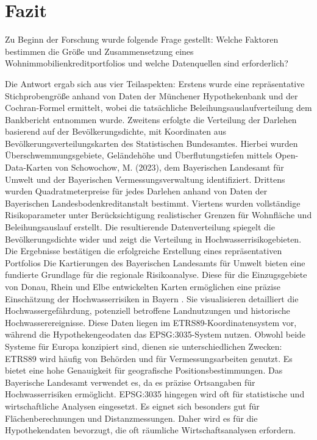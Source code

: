  \section{Fazit}
 Zu Beginn der Forschung wurde folgende Frage gestellt:
 Welche Faktoren bestimmen die Größe und Zusammensetzung eines Wohnimmobilienkreditportfolios und welche Datenquellen sind erforderlich?

 Die Antwort ergab sich aus vier Teilaspekten: Erstens wurde eine repräsentative Stichprobengröße anhand von Daten der Münchener Hypothekenbank und der Cochran-Formel ermittelt, wobei die tatsächliche Beleihungsauslaufverteilung dem Bankbericht entnommen wurde. Zweitens erfolgte die Verteilung der Darlehen basierend auf der Bevölkerungsdichte, mit Koordinaten aus Bevölkerungsverteilungskarten des Statistischen Bundesamtes. Hierbei wurden Überschwemmungsgebiete, Geländehöhe und Überflutungstiefen mittels Open-Data-Karten von Schowochow, M. (2023), dem Bayerischen Landesamt für Umwelt und der Bayerischen Vermessungsverwaltung identifiziert. Drittens wurden Quadratmeterpreise für jedes Darlehen anhand von Daten der Bayerischen Landesbodenkreditanstalt bestimmt. Viertens wurden vollständige Risikoparameter unter Berücksichtigung realistischer Grenzen für Wohnfläche und Beleihungsauslauf erstellt. Die resultierende Datenverteilung spiegelt die Bevölkerungsdichte wider und zeigt die Verteilung in Hochwasserrisikogebieten. Die Ergebnisse bestätigen die erfolgreiche Erstellung eines repräsentativen Portfolios
 Die Kartierungen des Bayerischen Landesamts für Umwelt bieten eine fundierte Grundlage für die regionale Risikoanalyse. Diese für die Einzugsgebiete von Donau, Rhein und Elbe entwickelten Karten ermöglichen eine präzise Einschätzung der Hochwasserrisiken in Bayern \parencite{LfU_Bayern}. Sie visualisieren detailliert die Hochwassergefährdung, potenziell betroffene Landnutzungen und historische Hochwasserereignisse.
Diese Daten liegen im ETRS89-Koordinatensystem vor, während die Hypothekengeodaten das EPSG:3035-System nutzen. Obwohl beide Systeme für Europa konzipiert sind, dienen sie unterschiedlichen Zwecken:
ETRS89 wird häufig von Behörden und für Vermessungsarbeiten genutzt. Es bietet eine hohe Genauigkeit für geografische Positionsbestimmungen. Das Bayerische Landesamt verwendet es, da es präzise Ortsangaben für Hochwasserrisiken ermöglicht.
EPSG:3035 hingegen wird oft für statistische und wirtschaftliche Analysen eingesetzt. Es eignet sich besonders gut für Flächenberechnungen und Distanzmessungen. Daher wird es für die Hypothekendaten bevorzugt, die oft räumliche Wirtschaftsanalysen erfordern.
